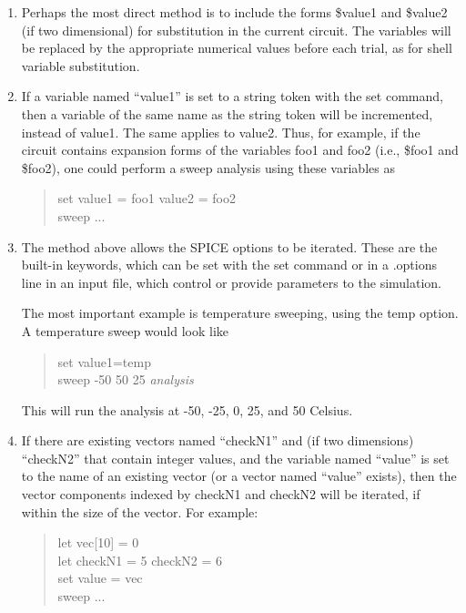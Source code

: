 \begin{enumerate}
\item{
Perhaps the most direct method is to include the forms {\vt
\$value1} and {\vt \$value2} (if two dimensional) for substitution in
the current circuit.  The variables will be replaced by the
appropriate numerical values before each trial, as for shell variable
substitution.
}

\item{
If a variable named ``{\vt value1}'' is set to a string token
with the {\cb set} command, then a variable of the same name as the
string token will be incremented, instead of {\vt value1}.  The same
applies to {\vt value2}.  Thus, for example, if the circuit contains
expansion forms of the variables {\vt foo1} and {\vt foo2} (i.e., {\vt
\$foo1} and {\vt \$foo2}), one could perform a sweep analysis using
these variables as

\begin{quote}
{\vt set value1 = foo1 value2 = foo2}\\
{\vt sweep} ...
\end{quote}
}

\item{
The method above allows the SPICE options to be iterated.  These are
the built-in keywords, which can be set with the {\cb set} command or
in a {\vt .options} line in an input file, which control or provide
parameters to the simulation.

The most important example is temperature sweeping, using the
{\vt temp} option.  A temperature sweep would look like

\begin{quote}
{\vt set value1=temp}\\
{\vt sweep -50 50 25} {\it analysis}
\end{quote}

This will run the analysis at -50, -25, 0, 25, and 50 Celsius.
}

\item{
If there are existing vectors named ``{\vt checkN1}'' and (if two
dimensions) ``{\vt checkN2}'' that contain integer values, and the
variable named ``{\vt value}'' is set to the name of an existing
vector (or a vector named ``{\vt value}'' exists), then the vector
components indexed by {\vt checkN1} and {\vt checkN2} will be
iterated, if within the size of the vector.  For example:

\begin{quote}
{\vt let vec[10] = 0}\\
{\vt let checkN1 = 5 checkN2 = 6}\\
{\vt set value = vec}\\
{\vt sweep} ...
\end{quote}

}
\end{enumerate}
